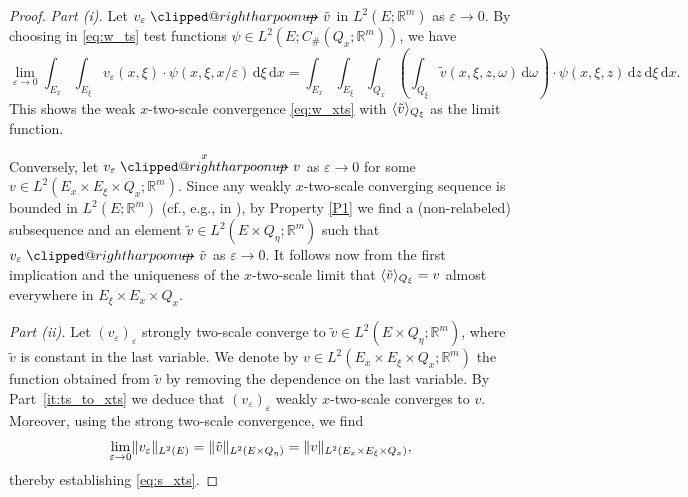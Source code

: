 \documentclass[reqno,11pt]{amsart}
\makeatletter
\numberwithin{equation}{section}
\theoremstyle{thmlemcorr}
\numberwithin{theorem}{section}
\theoremstyle{thmlemcorr*}
\theoremstyle{defi}
\theoremstyle{remexample}
\theoremstyle{ass}
\newcommand{\R}{\mathbb{R}}
\renewcommand{\epsilon}{\varepsilon}
\newcommand{\dd}{\,\mathrm{d}}
\DeclarePairedDelimiter{\norm}{\lVert}{\rVert}
\DeclarePairedDelimiter{\inner}{\langle}{\rangle}
\newcommand{\1}{\mathds{1}}
\DeclareRobustCommand{\wtwoscale}{%
  \clippedrightharpoonup\mathrel{\mspace{-15mu}}\rightharpoonup
}
\newcommand{\clippedrightharpoonup}{%
  \mathrel{\mathpalette\clipped@rightharpoonup\relax}%
}
\newcommand{\clipped@rightharpoonup}[2]{%
  \sbox\z@{$\m@th#1\mspace{6mu}$}%
  \clipbox{0pt 0pt {\dimexpr\width-.5\wd\z@} 0pt}{$\m@th#1\rightharpoonup$}%
  \smash{\clipbox{{\wd\z@} 0pt 0pt {-\width}}{$\m@th#1\rightharpoonup$}}%
}
\newcommand{\wxtwoscale}{\overset{x}{\wtwoscale}}
\newcommand{\veps}{\varepsilon}
\newcommand{\dl}{\,\mathrm{d}}
\makeatother
\begin{document}
\begin{proof}
    \textit{Part (i).}
    Let $v_\epsilon \wtwoscale \tilde{v}$ in $L^2(E;\R^m)$ as $\epsilon \to 0$. By choosing in \eqref{eq:w_ts} test functions $\psi\in L^2(E;C_{\#}(Q_x;\R^m))$, we have
    \begin{equation*}
        \lim_{\epsilon \to 0} \int_{E_x}\int_{E_\xi} v_\veps(x,\xi) \cdot \psi(x,\xi,x/\epsilon)\dd \xi\dd x 
        = \int_{E_x}\int_{E_\xi}\int_{Q_x}\left(\int_{Q_\xi} \tilde{v}(x,\xi,z,\omega)\dl \omega\right) \cdot \psi(x,\xi,z)\dd z\dd \xi \dd x.
    \end{equation*}
    This shows the weak $x$-two-scale convergence \eqref{eq:w_xts} with \(\inner{\tilde{v}}_{Q_\xi}\) as the limit function.
    
    Conversely, let $ v_\veps \wxtwoscale v$ as $\veps \to 0$ for some \(v\in L^2(E_x\times E_\xi\times Q_x;\R^m)\). Since any weakly \(x\)-two-scale converging sequence is bounded in $L^2(E;\R^m)$ (cf., e.g., in \cite[Theorem~6]{LNW02}), by Property \ref{P1} we find a (non-relabeled) subsequence and an element \(\tilde{v}\in L^2(E\times Q_\eta;\R^m)\) such that $v_\epsilon \wtwoscale \tilde{v}$ as $\veps \to 0$. It follows now from the first implication and the uniqueness of the \(x\)-two-scale limit that \(\inner{\tilde{v}}_{Q_\xi}=v\) almost everywhere in \(E_\xi\times E_x\times Q_x\). \smallskip

    \textit{Part (ii).}
    Let $(v_\epsilon)_{\epsilon}$ strongly two-scale converge to $\tilde{v}\in L^2(E\times Q_\eta;\R^m)$, where $\tilde{v}$ is constant in the last variable. We denote by $v \in L^2(E_x\times E_\xi \times Q_x;\R^m)$ the function obtained from $\tilde{v}$ by removing the dependence on the last variable. By Part~\ref{it:ts_to_xts} we deduce that $(v_\epsilon)_{\epsilon}$ weakly $x$-two-scale converges to $v$. Moreover, using the strong two-scale convergence, we find
    \[
    \lim_{\epsilon \to 0} \norm{v_\epsilon}_{L^2(E)} = \norm{\tilde{v}}_{L^2(E\times Q_\eta)} = \norm{v}_{L^2(E_x \times E_\xi\times Q_x)},
    \]
    thereby establishing \eqref{eq:s_xts}. 
    

\end{proof}
\end{document}
